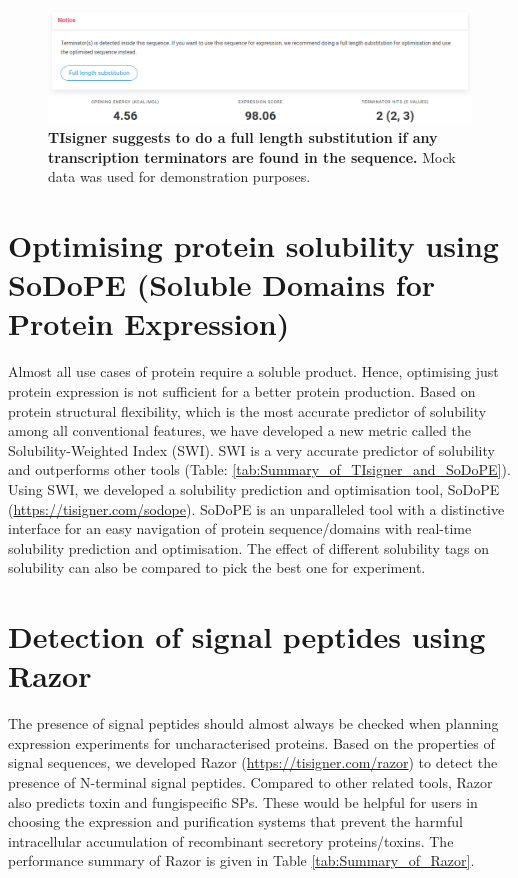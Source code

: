 \begin{figure}[htbp!]
\center
\includegraphics[width=1\textwidth]{chapters/Discussion/Figures/terminator_prompt.png}
\caption[TIsigner suggests to do a full length substitution if any transcription terminators are found in the sequence.]{\textbf{TIsigner suggests to do a full length substitution if any transcription terminators are found in the sequence.} Mock data was used for demonstration purposes.}%
\label{fig:terminator_prompt}
\end{figure}


\section{Optimising protein solubility using SoDoPE (Soluble Domains for Protein Expression)}
Almost all use cases of protein require a soluble product. Hence, optimising just protein expression is not sufficient for a better protein production. Based on protein structural flexibility, which is the most accurate predictor of solubility among all conventional features, we have developed a new metric called the Solubility-Weighted Index (SWI). SWI is a very accurate predictor of solubility and outperforms other tools (Table: \ref{tab:Summary_of_TIsigner_and_SoDoPE}). Using SWI, we developed a solubility prediction and optimisation tool, SoDoPE (\href{https://tisigner.com/sodope}{https://tisigner.com/sodope}). SoDoPE is an unparalleled tool with a distinctive interface for an easy navigation of protein sequence/domains with real-time solubility prediction and optimisation. The effect of different solubility tags on solubility can also be compared to pick the best one for experiment.


\section{Detection of signal peptides using Razor}
The presence of signal peptides should almost always be checked when planning expression experiments for uncharacterised proteins. Based on the properties of signal sequences, we developed Razor (\href{https://tisigner.com/razor}{https://tisigner.com/razor}) to detect the presence of N-terminal signal peptides. Compared to other related tools, Razor also predicts toxin and fungi\textemdash specific SPs. These would be helpful for users in choosing the expression and purification systems that prevent the harmful intracellular accumulation of recombinant secretory proteins/toxins. The performance summary of Razor is given in Table \ref{tab:Summary_of_Razor}.



